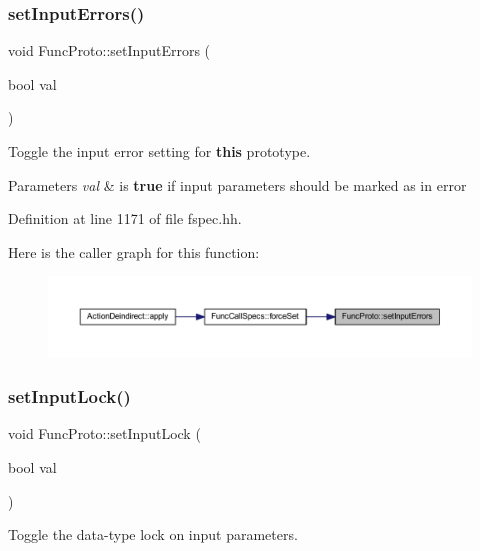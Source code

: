 \subsubsection{\texorpdfstring{setInputErrors()}{setInputErrors()}}
{\footnotesize\ttfamily void Func\+Proto\+::set\+Input\+Errors (\begin{DoxyParamCaption}\item[{bool}]{val }\end{DoxyParamCaption})\hspace{0.3cm}{\ttfamily [inline]}}



Toggle the input error setting for {\bfseries{this}} prototype. 


\begin{DoxyParams}{Parameters}
{\em val} & is {\bfseries{true}} if input parameters should be marked as in error \\
\hline
\end{DoxyParams}


Definition at line 1171 of file fspec.\+hh.

Here is the caller graph for this function\+:
\nopagebreak
\begin{figure}[H]
\begin{center}
\leavevmode
\includegraphics[width=350pt]{class_func_proto_ad5f36aaa3e2d1d7cdc90d101065abbc0_icgraph}
\end{center}
\end{figure}
\mbox{\label{class_func_proto_a4afe216709633a3b075111d6f1b7148f}} 
\subsubsection{\texorpdfstring{setInputLock()}{setInputLock()}}
{\footnotesize\ttfamily void Func\+Proto\+::set\+Input\+Lock (\begin{DoxyParamCaption}\item[{bool}]{val }\end{DoxyParamCaption})}



Toggle the data-\/type lock on input parameters. 

